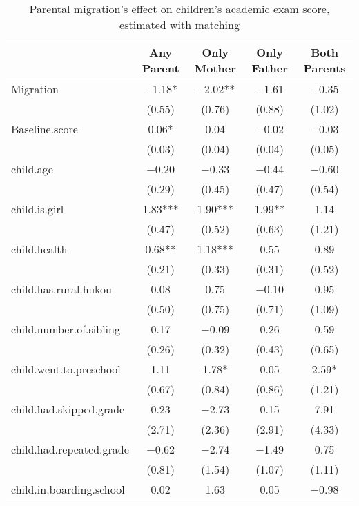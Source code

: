 \documentclass[
  man,floatsintext]{apa7}
\begin{document}
\begin{table}

\caption{Parental migration’s effect on children’s academic exam score, estimated with matching}
\centering
\begin{tabular}[t]{lcccc}
\toprule
  & Any Parent & Only Mother & Only Father & Both Parents\\
\midrule
Migration & \num{-1.18}* & \num{-2.02}** & \num{-1.61} & \num{-0.35}\\
 & (\num{0.55}) & (\num{0.76}) & (\num{0.88}) & (\num{1.02})\\
Baseline.score & \num{0.06}* & \num{0.04} & \num{-0.02} & \num{-0.03}\\
 & (\num{0.03}) & (\num{0.04}) & (\num{0.04}) & (\num{0.05})\\
child.age & \num{-0.20} & \num{-0.33} & \num{-0.44} & \num{-0.60}\\
 & (\num{0.29}) & (\num{0.45}) & (\num{0.47}) & (\num{0.54})\\
child.is.girl & \num{1.83}*** & \num{1.90}*** & \num{1.99}** & \num{1.14}\\
 & (\num{0.47}) & (\num{0.52}) & (\num{0.63}) & (\num{1.21})\\
child.health & \num{0.68}** & \num{1.18}*** & \num{0.55} & \num{0.89}\\
 & (\num{0.21}) & (\num{0.33}) & (\num{0.31}) & (\num{0.52})\\
child.has.rural.hukou & \num{0.08} & \num{0.75} & \num{-0.10} & \num{0.95}\\
 & (\num{0.50}) & (\num{0.75}) & (\num{0.71}) & (\num{1.09})\\
child.number.of.sibling & \num{0.17} & \num{-0.09} & \num{0.26} & \num{0.59}\\
 & (\num{0.26}) & (\num{0.32}) & (\num{0.43}) & (\num{0.65})\\
child.went.to.preschool & \num{1.11} & \num{1.78}* & \num{0.05} & \num{2.59}*\\
 & (\num{0.67}) & (\num{0.84}) & (\num{0.86}) & (\num{1.21})\\
child.had.skipped.grade & \num{0.23} & \num{-2.73} & \num{0.15} & \num{7.91}\\
 & (\num{2.71}) & (\num{2.36}) & (\num{2.91}) & (\num{4.33})\\
child.had.repeated.grade & \num{-0.62} & \num{-2.74} & \num{-1.49} & \num{0.75}\\
 & (\num{0.81}) & (\num{1.54}) & (\num{1.07}) & (\num{1.11})\\
child.in.boarding.school & \num{0.02} & \num{1.63} & \num{0.05} & \num{-0.98}\\

\end{tabular}
\end{table}
\end{document}
